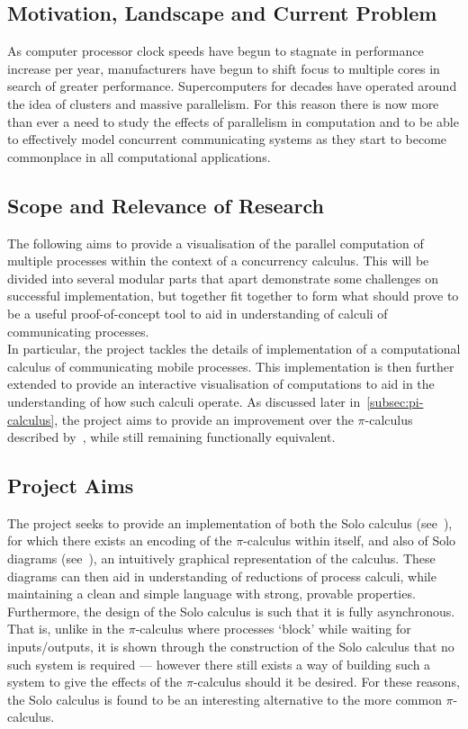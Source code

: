 \subsection{Motivation, Landscape and Current Problem}
    As computer processor clock speeds have begun to stagnate in performance increase per year, manufacturers have begun to shift focus to multiple cores in search of greater performance.
    Supercomputers for decades have operated around the idea of clusters and massive parallelism.
    For this reason there is now more than ever a need to study the effects of parallelism in computation and to be able to effectively model concurrent communicating systems as they start to become commonplace in all computational applications.


\subsection{Scope and Relevance of Research}
    The following aims to provide a visualisation of the parallel computation of multiple processes within the context of a concurrency calculus.
    This will be divided into several modular parts that apart demonstrate some challenges on successful implementation, but together fit together to form what should prove to be a useful proof-of-concept tool to aid in understanding of calculi of communicating processes.\\

    In particular, the project tackles the details of implementation of a computational calculus of communicating mobile processes.
    This implementation is then further extended to provide an interactive visualisation of computations to aid in the understanding of how such calculi operate.
    As discussed later in~\ref{subsec:pi-calculus}, the project aims to provide an improvement over the $\pi$-calculus described by~\cite{pi-calculus}, while still remaining functionally equivalent.


\subsection{Project Aims}
    The project seeks to provide an implementation of both the Solo calculus (see~\cite{solo-calculus}), for which there exists an encoding of the $\pi$-calculus within itself, and also of Solo diagrams (see~\cite{solo-diagrams}), an intuitively graphical representation of the calculus.
    These diagrams can then aid in understanding of reductions of process calculi, while maintaining a clean and simple language with strong, provable properties.
    Furthermore, the design of the Solo calculus is such that it is fully asynchronous.
    That is, unlike in the $\pi$-calculus where processes ‘block’ while waiting for inputs/outputs, it is shown through the construction of the Solo calculus that no such system is required — however there still exists a way of building such a system to give the effects of the $\pi$-calculus should it be desired.
    For these reasons, the Solo calculus is found to be an interesting alternative to the more common $\pi$-calculus.


